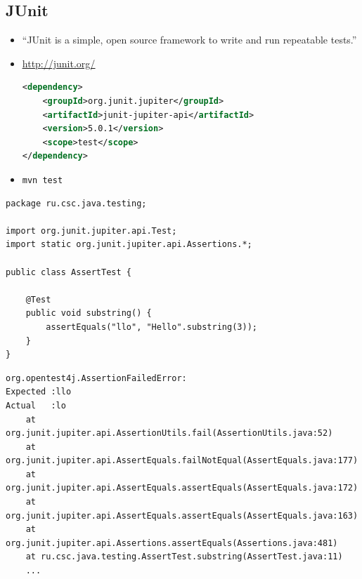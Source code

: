 \documentclass[unicode]{beamer}
\begin{document}
\subsection{JUnit}


\begin{frame}[fragile]
\begin{itemize}
\item ``JUnit is a simple, open source framework
    to write and run repeatable tests.''
    \bigskip

\item \underline{\url{http://junit.org/}}
\bigskip
\begin{lstlisting}[language=xml,keywords={}]
<dependency>
    <groupId>org.junit.jupiter</groupId>
    <artifactId>junit-jupiter-api</artifactId>
    <version>5.0.1</version>
    <scope>test</scope>
</dependency>
\end{lstlisting}
\bigskip
\item \texttt{mvn test}
\end{itemize}
\end{frame}


\begin{frame}[fragile]
\begin{lstlisting}
package ru.csc.java.testing;

import org.junit.jupiter.api.Test;
import static org.junit.jupiter.api.Assertions.*;

public class AssertTest {

    @Test
    public void substring() {
        assertEquals("llo", "Hello".substring(3));
    }
}
\end{lstlisting}
\end{frame}


\begin{frame}[fragile]
\scriptsize
\begin{verbatim}
org.opentest4j.AssertionFailedError: 
Expected :llo
Actual   :lo
    at org.junit.jupiter.api.AssertionUtils.fail(AssertionUtils.java:52)
    at org.junit.jupiter.api.AssertEquals.failNotEqual(AssertEquals.java:177)
    at org.junit.jupiter.api.AssertEquals.assertEquals(AssertEquals.java:172)
    at org.junit.jupiter.api.AssertEquals.assertEquals(AssertEquals.java:163)
    at org.junit.jupiter.api.Assertions.assertEquals(Assertions.java:481)
    at ru.csc.java.testing.AssertTest.substring(AssertTest.java:11)
    ...
\end{verbatim}
\end{frame}
\end{document}
